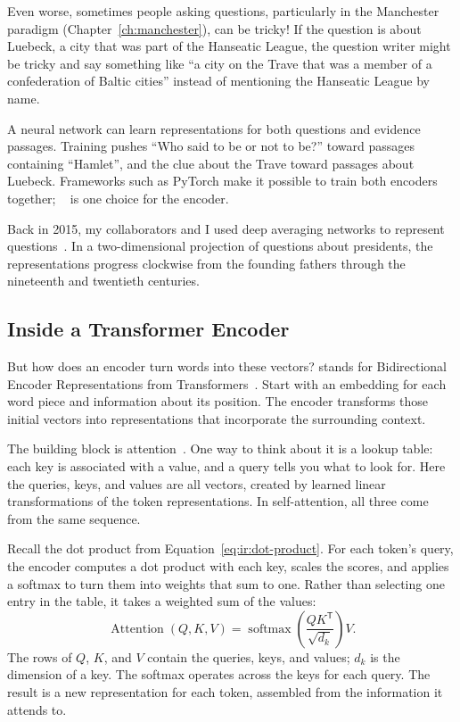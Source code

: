Even worse, sometimes people asking questions, particularly in the Manchester paradigm (Chapter~\ref{ch:manchester}), can be tricky!  If the question is about Luebeck, a city that was part of the Hanseatic League, the question writer might be tricky and say something like ``a city on the Trave that was a member of a confederation of Baltic cities'' instead of mentioning the Hanseatic League by name.

A neural network can learn representations for both questions and evidence passages.  Training pushes ``Who said to be or not to be?'' toward passages containing ``Hamlet'', and the clue about the Trave toward passages about Luebeck.  Frameworks such as PyTorch make it possible to train both encoders together; ~\citep{devlin-19} is one choice for the encoder.

Back in 2015, my collaborators and I used deep averaging networks to represent \quizbowl{} questions~\citep{iyyer-15}.  In a two-dimensional projection of questions about  presidents, the representations progress clockwise from the founding fathers through the nineteenth and twentieth centuries.

\subsection{Inside a Transformer Encoder}
\label{sec:formats:encoder}

But how does an encoder turn words into these vectors?   stands for Bidirectional Encoder Representations from Transformers~\citep{devlin-19}.  Start with an embedding for each word piece and information about its position.  The encoder transforms those initial vectors into representations that incorporate the surrounding context.

The building block is attention~\citep{vaswani-17}.  One way to think about it is a lookup table: each key is associated with a value, and a query tells you what to look for.  Here the queries, keys, and values are all vectors, created by learned linear transformations of the token representations.  In self-attention, all three come from the same sequence.

Recall the dot product from Equation~\ref{eq:ir:dot-product}.  For each token's query, the encoder computes a dot product with each key, scales the scores, and applies a softmax to turn them into weights that sum to one.  Rather than selecting one entry in the table, it takes a weighted sum of the values:
\begin{equation}
  \operatorname{Attention}(Q,K,V)
  = \operatorname{softmax}\left(\frac{QK^{\mathsf{T}}}{\sqrt{d_k}}\right)V.
  \label{eq:formats:attention}
\end{equation}
The rows of $Q$, $K$, and $V$ contain the queries, keys, and values; $d_k$ is the dimension of a key.  The softmax operates across the keys for each query.  The result is a new representation for each token, assembled from the information it attends to.

